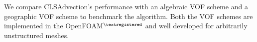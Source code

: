 We compare CLSAdvection's performance with an algebraic VOF scheme\citep{deshpande2012evaluating} and a geographic VOF scheme\citep{roenby2016computational} to benchmark the algorithm. Both the VOF schemes are implemented in the OpenFOAM$^{\textregistered}$ and well developed for arbitrarily unstructured meshes.





